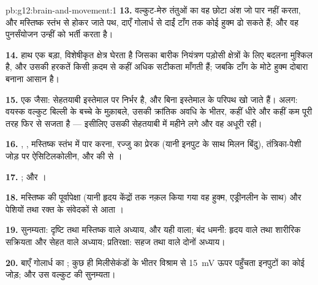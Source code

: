 \begin{solution}{pb:g12:brain-and-movement:1}
\textbf{13.} वल्कुट-मेरु तंतुओं का वह छोटा अंश जो पार नहीं करता, और
मस्तिष्क स्तंभ से होकर जाते पथ, दाएँ गोलार्ध से दाईं टाँग तक कोई हुक्म ढो
सकते हैं; और वह पुनर्संयोजन उन्हीं को भर्ती करता है।

\textbf{14.} हाथ एक बड़ा, विशेषीकृत क्षेत्र घेरता है जिसका बारीक नियंत्रण
पड़ोसी क्षेत्रों के लिए बदलना मुश्किल है, और उसकी हरकतें किसी क़दम से कहीं
अधिक सटीकता माँगती हैं; जबकि टाँग के मोटे हुक्म दोबारा बनाना आसान है।

\textbf{15.} एक जैसा: सेहतयाबी इस्तेमाल पर निर्भर है, और बिना इस्तेमाल के
परिपथ खो जाते हैं। अलग: वयस्क वल्कुट बिल्ली के बच्चे के मुक़ाबले, उसकी
क्रांतिक अवधि के भीतर, कहीं धीरे और कहीं कम पूरी तरह फिर से सजता है ---
इसीलिए उसकी सेहतयाबी में महीने लगे और वह अधूरी रही।

\textbf{16.} , , मस्तिष्क स्तंभ में पार करना,
रज्जु का प्रेरक  (यानी  इनपुट के साथ मिलन बिंदु),
तंत्रिका-पेशी जोड़ पर ऐसिटिलकोलीन, और  की  से ।

\textbf{17.} ; और ।

\textbf{18.} मस्तिष्क की पूर्वापेक्षा (यानी हृदय केंद्रों तक नक़ल किया गया
वह हुक्म, एड्रीनलीन के साथ) और पेशियों तथा रक्त के संवेदकों से आता ।

\textbf{19.} सुनम्यता: दृष्टि तथा मस्तिष्क वाले अध्याय, और यही वाला; बंद
धमनी: हृदय वाले तथा शारीरिक सक्रियता और सेहत वाले अध्याय; प्रतिरक्षा: सहज
तथा  वाले दोनों अध्याय।

\textbf{20.} बाएँ गोलार्ध का ; कुछ ही मिलीसेकंडों के
भीतर विश्राम से \qty{15}{mV} ऊपर पहुँचता इनपुटों का कोई जोड़; और उस वल्कुट की
सुनम्यता।
\end{solution}
